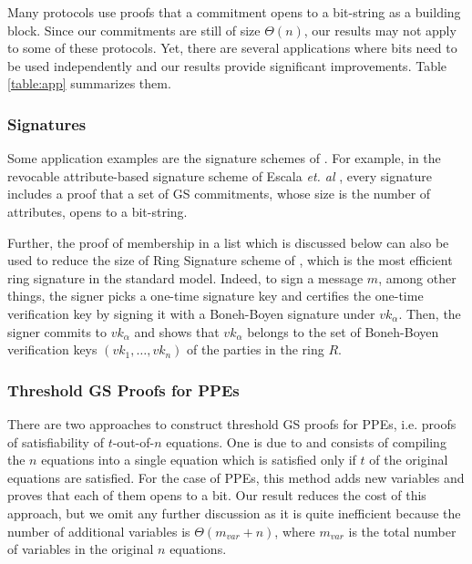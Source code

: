 Many protocols use proofs that a commitment opens to a bit-string as a 
  building block. 
Since our commitments are still of size $\Theta(n)$,
  our results may not apply to some of these protocols. 
Yet, there are several applications where 
  bits need to be used independently and our results provide 
  significant improvements.
Table \ref{table:app} summarizes them.
 
\subsubsection{Signatures} Some application examples are the signature schemes of  \cite{PKC:BFPV11,SCN:BlaPoiVer12,RSA:Camacho13,AFRICACRYPT:EscHerMor11}. For example, in the revocable attribute-based signature scheme of Escala \textit{et. al} \cite{AFRICACRYPT:EscHerMor11}, every signature includes a proof that a set of GS commitments, whose size is the number of attributes, opens to a bit-string. 

Further, the proof of membership in a list which is discussed below can also be used to reduce the size of Ring Signature scheme of  \cite{ICALP:ChaGroSah07}, which is the most efficient ring signature in the standard model. Indeed, to sign a message $m$, among other things, the signer picks a one-time signature key and certifies the one-time verification key by signing it with a Boneh-Boyen signature under $vk_\alpha$. Then, the signer commits to $vk_\alpha$ and shows that $vk_\alpha$ belongs to the set of Boneh-Boyen verification keys $(vk_1,\ldots,vk_n)$ of the parties in the ring $R$. 



\subsubsection{Threshold GS Proofs for PPEs} There are two approaches to construct threshold GS proofs for PPEs, i.e. proofs of satisfiability of $t$-out-of-$n$ equations. One is due to \cite{AC:Groth06} and consists of compiling the $n$ equations into a single equation which is satisfied only if $t$ of the original equations are satisfied. For the case of PPEs, this method adds new variables and proves that each of them opens to a bit.  Our result reduces the cost of this approach, but we omit any further discussion as it is quite inefficient because the number of additional variables is $\Theta(m_{var}+n)$, where $m_{var}$ is the total number of variables in the original $n$ equations.

